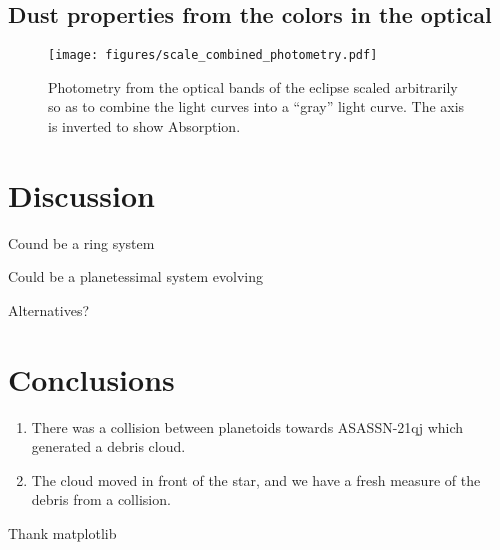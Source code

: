 \documentclass{aa}
\begin{document}
\subsection{Dust properties from the colors in the optical}



\begin{figure*}
   \begin{centering}
   \texttt{[image: figures/scale\_combined\_photometry.pdf]}
      \caption{Photometry from the optical bands of the eclipse scaled arbitrarily so as to combine the light curves into a ``gray'' light curve.
      The axis is inverted to show Absorption.
              }
              \label{fig:allphot}
              \end{centering}
       \end{figure*}



\section{Discussion}\label{sec:discussion}

Cound be a ring system

Could be a planetessimal system evolving

Alternatives?

\section{Conclusions}\label{sec:conclusion}

   \begin{enumerate}
      \item There was a collision between planetoids towards ASASSN-21qj which generated a debris cloud.
      \item The cloud moved in front of the star, and we have a fresh measure of the debris from a collision.
   \end{enumerate}

\begin{acknowledgements}
Thank matplotlib

\end{acknowledgements}



\end{document}
